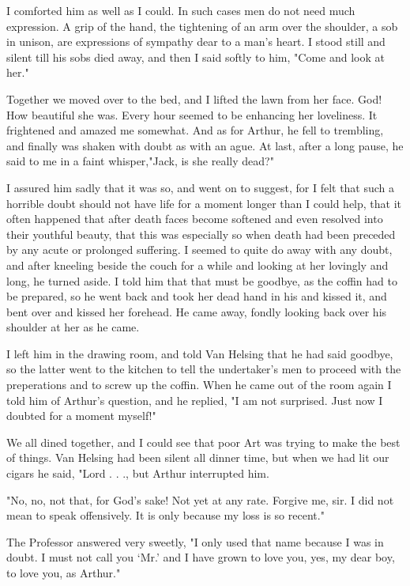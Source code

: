 I comforted him as well as I could. In such cases men do not need much expression. A grip of the hand, the tightening of an arm over the shoulder, a sob in unison, are expressions of sympathy dear to a man's heart. I stood still and silent till his sobs died away, and then I said softly to him, "Come and look at her." 

Together we moved over to the bed, and I lifted the lawn from her face. God! How beautiful she was. Every hour seemed to be enhancing her loveliness. It frightened and amazed me somewhat. And as for Arthur, he fell to trembling, and finally was shaken with doubt as with an ague. At last, after a long pause, he said to me in a faint whisper,"Jack, is she really dead?" 

I assured him sadly that it was so, and went on to suggest, for I felt that such a horrible doubt should not have life for a moment longer than I could help, that it often happened that after death faces become softened and even resolved into their youthful beauty, that this was especially so when death had been preceded by any acute or prolonged suffering. I seemed to quite do away with any doubt, and after kneeling beside the couch for a while and looking at her lovingly and long, he turned aside. I told him that that must be goodbye, as the coffin had to be prepared, so he went back and took her dead hand in his and kissed it, and bent over and kissed her forehead. He came away, fondly looking back over his shoulder at her as he came. 

I left him in the drawing room, and told Van Helsing that he had said goodbye, so the latter went to the kitchen to tell the undertaker's men to proceed with the preperations and to screw up the coffin. When he came out of the room again I told him of Arthur's question, and he replied, "I am not surprised. Just now I doubted for a moment myself!" 

We all dined together, and I could see that poor Art was trying to make the best of things. Van Helsing had been silent all dinner time, but when we had lit our cigars he said, "Lord . . ., but Arthur interrupted him. 

"No, no, not that, for God's sake! Not yet at any rate. Forgive me, sir. I did not mean to speak offensively. It is only because my loss is so recent." 

The Professor answered very sweetly, "I only used that name because I was in doubt. I must not call you `Mr.' and I have grown to love you, yes, my dear boy, to love you, as Arthur." 

